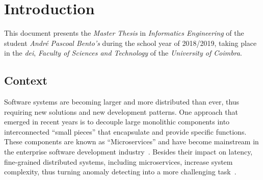 \glsresetall
\chapter{Introduction}
\label{chap:introduction}

This document presents the \textit{Master Thesis} in \textit{Informatics Engineering} of the student \textit{André Pascoal Bento's} during the school year of 2018/2019, taking place in the \textit{\gls{dei}}, \textit{Faculty of Sciences and Technology} of the \textit{University of Coimbra}.

\section{Context}
\label{sec:context}


Software systems are becoming larger and more distributed than ever, thus requiring new solutions and new development patterns. One approach that emerged in recent years is to decouple large monolithic components into interconnected ``small pieces'' that encapsulate and provide specific functions. These components are known as ``Microservices'' and have become mainstream in the enterprise software development industry~\cite{Dragoni2017, microservices_definition}. Besides their impact on latency, fine-grained distributed systems, including microservices, increase system complexity, thus turning anomaly detecting into a more challenging task~\cite{Francesco2017}.


